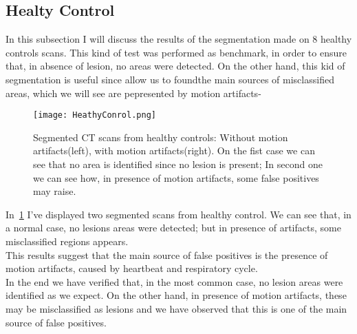 
	\subsection{Healty Control}
	
	In this subsection I will discuss the results of the segmentation made on $8$ healthy controls scans. This kind of  test was performed as benchmark, in order to ensure that, in absence of lesion, no areas were detected. On the other hand, this kid of segmentation is useful since allow us to foundthe main sources of misclassified areas, which we will see are pepresented by motion artifacts-
	
	\begin{figure}[h!]
		\centering
			\texttt{[image: HeathyConrol.png]}
			\caption{Segmented CT scans from healthy controls: Without motion artifacts(left), with motion artifacts(right). On the fist case we can see that no area is identified since no lesion is present; In second one we can see how, in presence of motion artifacts, some false positives may raise.  }\label{fig:HealthyControl}
	\end{figure}

	In \figurename\,\ref{fig:HealthyControl} I've displayed two segmented scans from healthy control. We can see that, in a normal case, no lesions areas were detected; but in presence of artifacts, some misclassified regions appears.\\
	This results suggest that the main source of false positives is the presence of motion artifacts, caused by heartbeat and respiratory cycle.\\
	
	In the end we have verified that, in the most common case, no lesion areas were identified as we expect. On the other hand, in presence of motion artifacts, these may be misclassified as lesions and we have observed that this is one of the main source of false positives. 
	
	
	

